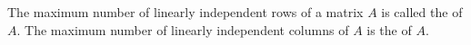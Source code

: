 The maximum number of linearly independent rows of a matrix $A$ is called the  of $A$. The maximum number of linearly independent columns of $A$ is the  of $A$.

